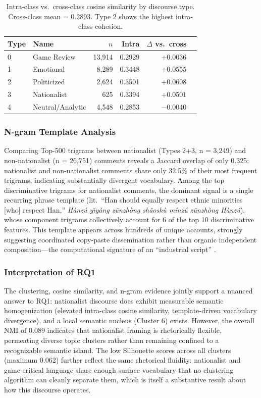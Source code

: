 \documentclass[man, 12pt, mask, floatsintext]{apa7}
\begin{document}
\begin{table}[!htbp]
\centering
\caption{Intra-class vs.\ cross-class cosine similarity by discourse type. Cross-class mean = 0.2893. Type 2 shows the highest intra-class cohesion.}
\label{tab:cosine}
\begin{tabular}{llrrrr}
\toprule
Type & Name & $n$ & Intra & $\Delta$ vs.\ cross \\
\midrule
0 & Game Review & 13,914 & 0.2929 & +0.0036 \\
1 & Emotional & 8,289 & 0.3448 & +0.0555 \\
2 & Politicized & 2,624 & 0.3501 & +0.0608 \\
3 & Nationalist & 625 & 0.3394 & +0.0501 \\
4 & Neutral/Analytic & 4,548 & 0.2853 & $-$0.0040 \\
\bottomrule
\end{tabular}
\end{table}

\subsubsection{N-gram Template Analysis}
Comparing Top-500 trigrams between nationalist (Types 2+3, n = 3,249) and non-nationalist (n = 26,751) comments reveals a Jaccard overlap of only 0.325: nationalist and non-nationalist comments share only 32.5\% of their most frequent trigrams, indicating substantially divergent vocabulary. Among the top discriminative trigrams for nationalist comments, the dominant signal is a single recurring phrase template (lit.\ ``Han should equally respect ethnic minorities [who] respect Han,'' \textit{H\`{a}nz\'{u} y\={\i}y\`{a}ng z\={u}nzh\`{o}ng sh\v{a}osh\`{u} m\'{i}nz\'{u} z\={u}nzh\`{o}ng H\`{a}nz\'{u}}), whose component trigrams collectively account for 6 of the top 10 discriminative features. This template appears across hundreds of unique accounts, strongly suggesting coordinated copy-paste dissemination rather than organic independent composition---the computational signature of an ``industrial script'' \parencite{schneider2018}.

\subsubsection{Interpretation of RQ1}
The clustering, cosine similarity, and n-gram evidence jointly support a nuanced answer to RQ1: nationalist discourse does exhibit measurable semantic homogenization (elevated intra-class cosine similarity, template-driven vocabulary divergence), and a local semantic nucleus (Cluster 6) exists. However, the overall NMI of 0.089 indicates that nationalist framing is rhetorically flexible, permeating diverse topic clusters rather than remaining confined to a recognizable semantic island. The low Silhouette scores across all clusters (maximum 0.062) further reflect the same rhetorical fluidity: nationalist and game-critical language share enough surface vocabulary that no clustering algorithm can cleanly separate them, which is itself a substantive result about how this discourse operates.
\end{document}
